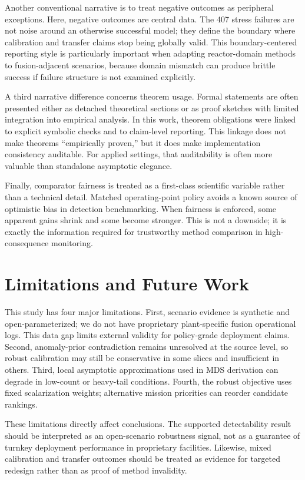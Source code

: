 Another conventional narrative is to treat negative outcomes as peripheral exceptions. Here, negative outcomes are central data. The 407 stress failures are not noise around an otherwise successful model; they define the boundary where calibration and transfer claims stop being globally valid. This boundary-centered reporting style is particularly important when adapting reactor-domain methods to fusion-adjacent scenarios, because domain mismatch can produce brittle success if failure structure is not examined explicitly.

A third narrative difference concerns theorem usage. Formal statements are often presented either as detached theoretical sections or as proof sketches with limited integration into empirical analysis. In this work, theorem obligations were linked to explicit symbolic checks and to claim-level reporting. This linkage does not make theorems ``empirically proven,'' but it does make implementation consistency auditable. For applied settings, that auditability is often more valuable than standalone asymptotic elegance.

Finally, comparator fairness is treated as a first-class scientific variable rather than a technical detail. Matched operating-point policy avoids a known source of optimistic bias in detection benchmarking. When fairness is enforced, some apparent gains shrink and some become stronger. This is not a downside; it is exactly the information required for trustworthy method comparison in high-consequence monitoring.

\section{Limitations and Future Work}\label{sec:limitations}
This study has four major limitations. First, scenario evidence is synthetic and open-parameterized; we do not have proprietary plant-specific fusion operational logs. This data gap limits external validity for policy-grade deployment claims. Second, anomaly-prior contradiction remains unresolved at the source level, so robust calibration may still be conservative in some slices and insufficient in others. Third, local asymptotic approximations used in MDS derivation can degrade in low-count or heavy-tail conditions. Fourth, the robust objective uses fixed scalarization weights; alternative mission priorities can reorder candidate rankings.

These limitations directly affect conclusions. The supported detectability result should be interpreted as an open-scenario robustness signal, not as a guarantee of turnkey deployment performance in proprietary facilities. Likewise, mixed calibration and transfer outcomes should be treated as evidence for targeted redesign rather than as proof of method invalidity.

